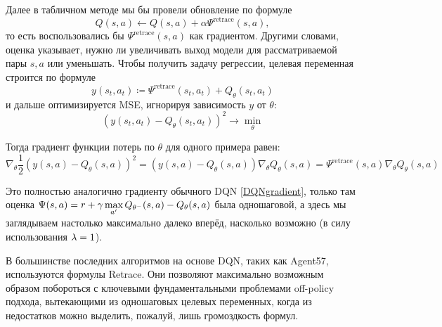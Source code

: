 Далее в табличном методе мы бы провели обновление по формуле
$$Q(s, a) \leftarrow Q(s, a) + \alpha \Psi^{\mathrm{retrace}}(s, a),$$
то есть воспользовались бы $\Psi^{\mathrm{retrace}}(s, a)$ как градиентом. Другими словами, оценка указывает, нужно ли увеличивать выход модели для рассматриваемой пары $s, a$ или уменьшать. Чтобы получить задачу регрессии, целевая переменная строится по формуле
$$y(s_t, a_t) \coloneqq \Psi^{\mathrm{retrace}}(s_t, a_t) + Q_{\theta}(s_t, a_t)$$
и дальше оптимизируется MSE, игнорируя зависимость $y$ от $\theta$:
$$\left( y(s_t, a_t) - Q_{\theta}(s_t, a_t) \right)^2 \to \min_{\theta}$$

Тогда градиент функции потерь по $\theta$ для одного примера равен:
$$\nabla_\theta \frac{1}{2}\left( y(s, a) - Q_{\theta}(s, a) \right)^2 = \left( y(s, a) - Q_{\theta}(s, a) \right) \nabla_\theta Q_{\theta}(s, a) = \Psi^{\mathrm{retrace}}(s, a) \nabla_\theta Q_{\theta}(s, a)$$

Это полностью аналогично градиенту обычного DQN \eqref{DQNgradient}, только там оценка $\Psi(s, a) \HM= r + \gamma \max\limits_{a'} Q_{\theta^{-}}(s, a) - Q_{\theta}(s, a)$ была одношаговой, а здесь мы заглядываем настолько максимально далеко вперёд, насколько возможно (в силу использования $\lambda \HM= 1$). 

\begin{remark}
В большинстве последних алгоритмов на основе DQN, таких как Agent57, используются формулы Retrace. Они позволяют максимально возможным образом побороться с ключевыми фундаментальными проблемами off-policy подхода, вытекающими из одношаговых целевых переменных, когда из недостатков можно выделить, пожалуй, лишь громоздкость формул.
\end{remark}
